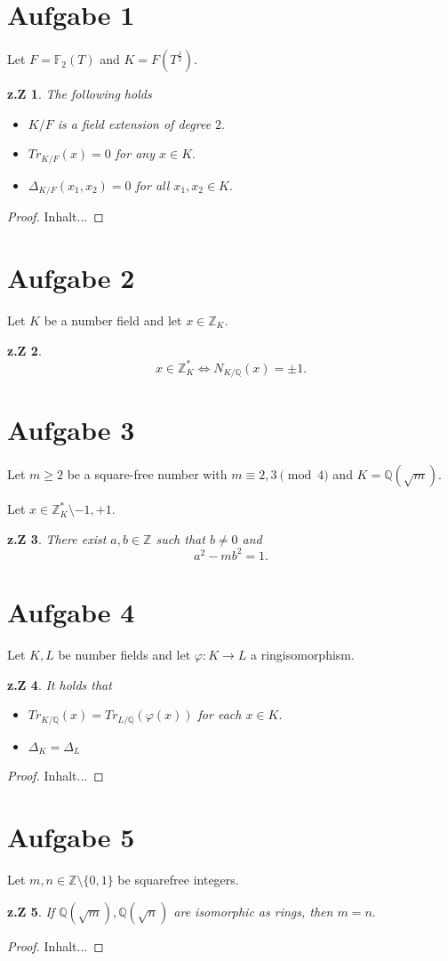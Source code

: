 \documentclass[10pt,a4paper]{article}
\date{\today}
\newtheorem*{zz*}{z.Z}
\newcommand{\QQ}{\mathbb{Q}}
\newcommand{\ZZ}{\mathbb{Z}}
\newcommand{\FF}{\mathbb{F}}
\begin{document}
	
\section*{Aufgabe 1}
	Let $F = \FF_2(T)$ and $K = F(T^{\frac{1}{2}}).$
	\begin{zz*}
		The following holds
		\begin{itemize}
			\item [(i)] $K/F$ is a field extension of degree $2.$
			\item [(ii)] $Tr_{K/F}(x) = 0$ for any $x\in K.$
			\item [(iii)] $\Delta_{K/F}(x_1, x_2) = 0$ for all $x_1, x_2\in K.$
		\end{itemize}
	\end{zz*}
	\begin{proof}
		Inhalt...
	\end{proof}
\pagebreak
\section*{Aufgabe 2}
	Let $K$ be a number field and let $x\in \ZZ_K.$
	\begin{zz*}
		\[x\in \ZZ_K^*\Leftrightarrow N_{K/\QQ}(x) = \pm1.\]
	\end{zz*}
\pagebreak

\section*{Aufgabe 3}
	Let $m\geq 2$ be a square-free number with $m\equiv 2,3 \pmod{4}$ and $K = \QQ(\sqrt{m}).$	
	
	Let $x\in \ZZ_K^*\setminus{-1, +1}.$
	\begin{zz*}
		There exist $a,b\in \ZZ$ such that $b\neq0$ and
		\[a^2 - mb^2 = 1.\]
	\end{zz*}
\pagebreak

\section*{Aufgabe 4}
	Let $K, L$ be number fields and let $\varphi: K\to L$ a ringisomorphism.
	
	\begin{zz*}
		It holds that
		\begin{itemize}
			\item [(i)] $Tr_{K/\QQ}(x) = Tr_{L/\QQ}(\varphi(x))$ for each $x\in K.$
			\item [(ii)] $\Delta_K = \Delta_L$
		\end{itemize}
	\end{zz*}
	\begin{proof}
		Inhalt...
	\end{proof}
	
\section*{Aufgabe 5}
	Let $m,n\in \ZZ\setminus\{0,1\}$ be squarefree integers.
	\begin{zz*}
		If $\QQ(\sqrt{m}), \QQ(\sqrt{n})$ are isomorphic as rings, then $m = n.$
	\end{zz*}
	\begin{proof}
		Inhalt...
	\end{proof}
\end{document}
